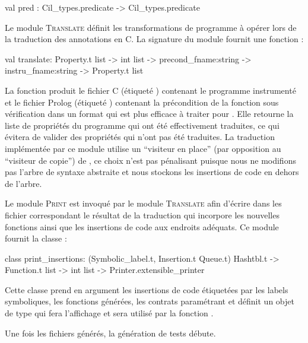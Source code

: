 \begin{ocamlcode}
val pred : Cil_types.predicate -> Cil_types.predicate
\end{ocamlcode}

Le module \textsc{Translate} définit les transformations de programme à opérer
lors de la traduction des annotations \eacsl en C.
La signature du module fournit une fonction  :

\begin{ocamlcode}
val translate:
  Property.t list ->
  int list ->
  precond_fname:string ->
  instru_fname:string ->
  Property.t list
\end{ocamlcode}

La fonction  produit le fichier C (étiqueté
) contenant le programme instrumenté et le fichier
Prolog (étiqueté ) contenant la précondition de la
fonction sous vérification dans un format qui est plus efficace à traiter pour
\pathcrawler.
Elle retourne la liste de propriétés du programme qui ont été effectivement
traduites, ce qui évitera de valider des propriétés qui n'ont pas été traduites.
La traduction implémentée par ce module utilise un ``visiteur en place'' (par
opposition au ``visiteur de copie'') de \framac
\cite[section 4.16]{frama-c-devman}, ce choix n'est pas pénalisant
puisque nous ne modifions pas l'arbre de syntaxe abstraite et nous stockons les
insertions de code en dehors de l'arbre.

Le module \textsc{Print} est invoqué par le module \textsc{Translate} afin
d'écrire dans les fichier correspondant le résultat de la traduction qui
incorpore les nouvelles fonctions ainsi que les insertions de code aux endroits 
adéquats.
Ce module fournit la classe  :

\begin{ocamlcode}
class print_insertions:
  (Symbolic_label.t, Insertion.t Queue.t) Hashtbl.t ->
  Function.t list ->
  int list ->
  Printer.extensible_printer
\end{ocamlcode}

Cette classe prend en argument les insertions de code étiquetées par les
labels symboliques, les fonctions générées, les contrats paramétrant \SWD et
définit un objet de type  qui fera l'affichage et sera
utilisé par la fonction .

Une fois les fichiers générés, la génération de tests débute.


